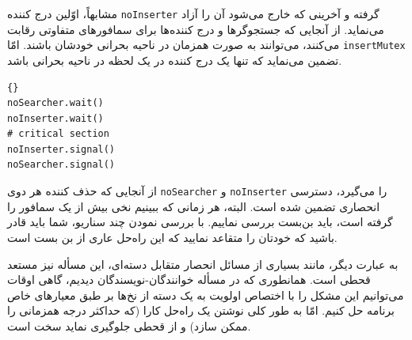 \documentclass{book}
\begin{document}

    مشابهاً، اوّلین درج کننده {\tt noInserter} گرفته و آخرینی که خارج می‌شود آن را آزاد می‌نماید.
    از آنجایی که جستجوگرها و درج کننده‌ها برای سمافورهای متفاوتی رقابت می‌کنند، می‌توانند به صورت همزمان در ناحیه بحرانی خودشان 
    باشند. امّا {\tt insertMutex} تضمین می‌نماید که تنها یک درج کننده در یک لحظه‌ در ناحیه بحرانی باشد. 

\begin{latin}
\begin{lstlisting}[title={راه حل جستجو-درج-حذف (حذف کننده)}]{}
noSearcher.wait()
noInserter.wait()
# critical section
noInserter.signal()
noSearcher.signal()

\end{lstlisting}
\end{latin}

    از آنجایی که حذف کننده هر دوی  {\tt noSearcher} و {\tt noInserter} را می‌گیرد، دسترسی انحصاری تضمین شده است. 
    البته، هر زمانی که ببینیم نخی بیش از یک سمافور را گرفته است، باید بن‌بست بررسی نماییم. با بررسی نمودن چند سناریو، 
    شما باید قادر باشید که خودتان را متقاعد نمایید که این راه‌حل عاری از بن بست است. 

    به عبارت دیگر، مانند بسیاری از مسائل انحصار متقابل دسته‌ای، این مسأله نیز مستعد قحطی است. 
    همانطوری که در مسأله خوانندگان-نویسندگان دیدیم، گاهی اوقات می‌توانیم این مشکل را با اختصاص اولویت به یک دسته از نخ‌ها 
    بر طبق معیارهای خاص برنامه حل کنیم. 
    امّا به طور کلی نوشتن یک راه‌حل کارا (که حداکثر درجه همزمانی را ممکن سازد) و از قحطی جلوگیری نماید سخت است. 
\end{document}
